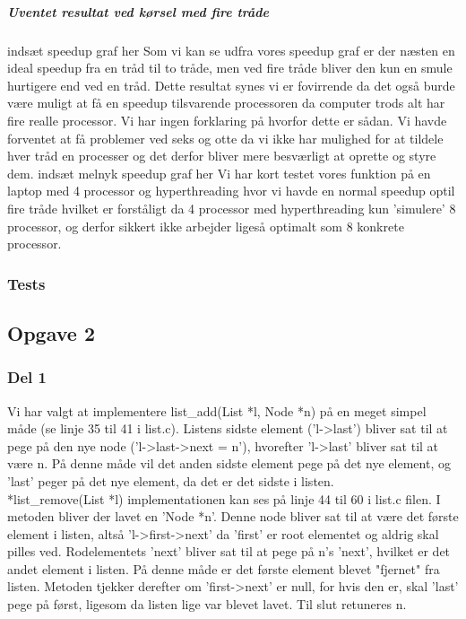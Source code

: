 \subparagraph{Uventet resultat ved kørsel med fire tråde}
indsæt speedup graf her \n\n
Som vi kan se udfra vores speedup graf er der næsten en ideal speedup fra en tråd til to tråde, men ved fire tråde bliver den kun en smule hurtigere end ved en tråd. Dette resultat synes vi er fovirrende da det også burde være muligt at få en speedup tilsvarende processoren da computer trods alt har fire realle processor. Vi har ingen forklaring på hvorfor dette er sådan. 
Vi havde forventet at få problemer ved seks og otte da vi ikke har mulighed for at tildele hver tråd en processer og det derfor bliver mere besværligt at oprette og styre dem. 
indsæt melnyk speedup graf her \n\n
Vi har kort testet vores funktion på en laptop med 4 processor og hyperthreading hvor vi havde en normal speedup optil fire tråde hvilket er forståligt da 4 processor med hyperthreading kun 'simulere' 8 processor, og derfor sikkert ikke arbejder ligeså optimalt som 8 konkrete processor.

\subsubsection{Tests}
\label{O1_Tests}


\subsection{Opgave 2}
\label{O2}

\subsubsection{Del 1}
\label{O2_1}
Vi har valgt at implementere list_add(List *l, Node *n) på en meget simpel måde (se linje 35 til 41 i list.c). Listens sidste element ('l->last') bliver sat til at pege på den nye node ('l->last->next = n'), hvorefter 'l->last' bliver sat til at være n. På denne måde vil det anden sidste element pege på det nye element, og 'last' peger på det nye element, da det er det sidste i listen.
\\*list_remove(List *l) implementationen kan ses på linje 44 til 60 i list.c filen. I metoden bliver der lavet en 'Node *n'. Denne node bliver sat til at være det første element i listen, altså 'l->first->next' da 'first' er root elementet og aldrig skal pilles ved. Rodelementets 'next' bliver sat til at pege på n's 'next', hvilket er det andet element i listen. På denne måde er det første element blevet "fjernet" fra listen. Metoden tjekker derefter om 'first->next' er null, for hvis den er, skal 'last' pege på først, ligesom da listen lige var blevet lavet. Til slut retuneres n.

